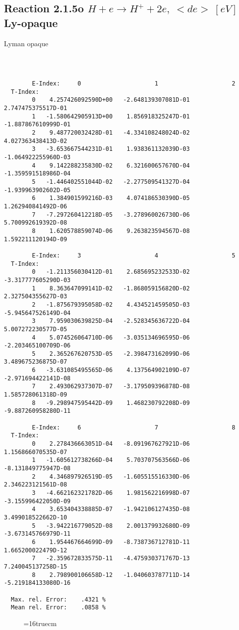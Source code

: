 \documentclass[12pt]{article}
\begin{document}
\subsection{
Reaction 2.1.5o  $ H + e \rightarrow H^+ + 2e, \   <de> \ [eV]$ Ly-opaque}

Lyman opaque

\begin{small}\begin{verbatim}



        E-Index:     0                     1                     2
  T-Index:
        0    4.257426092590D+00   -2.648139307081D-01    2.747475375517D-01
        1   -1.580642905913D+00    1.856918325247D-01   -1.887867610999D-01
        2    9.487720032428D-01   -4.334108248024D-02    4.027363438413D-02
        3   -3.653667544231D-01    1.938361132039D-03   -1.064922255960D-03
        4    9.142288235830D-02    6.321600657670D-04   -1.359591518986D-04
        5   -1.446402551044D-02   -2.277509541327D-04   -1.939963902602D-05
        6    1.384901599216D-03    4.074186530390D-05    1.262940841492D-06
        7   -7.297260412218D-05   -3.278960026730D-06    5.700992619392D-08
        8    1.620578859074D-06    9.263823594567D-08    1.592211120194D-09

        E-Index:     3                     4                     5
  T-Index:
        0   -1.211356030412D-01    2.685695232533D-02   -3.317777605290D-03
        1    8.363647099141D-02   -1.868059156820D-02    2.327504355627D-03
        2   -1.875679395058D-02    4.434521459505D-03   -5.945647526149D-04
        3    7.959030639825D-04   -2.528345636722D-04    5.007272230577D-05
        4    5.074526064710D-06   -3.035134696595D-06   -2.203465100709D-06
        5    2.365267620753D-05   -2.398473162099D-06    3.489675236875D-07
        6   -3.631085495565D-06    4.137564902109D-07   -2.971694422141D-08
        7    2.493062937307D-07   -3.179509396878D-08    1.585728061318D-09
        8   -9.298947595442D-09    1.468230792208D-09   -9.887260958280D-11

        E-Index:     6                     7                     8
  T-Index:
        0    2.278436663051D-04   -8.091967627921D-06    1.156866070535D-07
        1   -1.605612738266D-04    5.703707563566D-06   -8.131849775947D-08
        2    4.346897926519D-05   -1.605515516330D-06    2.346223121561D-08
        3   -4.662162321782D-06    1.981562216998D-07   -3.155996422050D-09
        4    3.653404338885D-07   -1.942106127435D-08    3.499018522662D-10
        5   -3.942216779052D-08    2.001379932680D-09   -3.673145766979D-11
        6    1.954467664699D-09   -8.738736712781D-11    1.665200022479D-12
        7   -2.359672833575D-11   -4.475930371767D-13    7.240045137258D-15
        8    2.798900106658D-12   -1.040603787711D-14   -5.219184133080D-16

  Max. rel. Error:    .4321 %
  Mean rel. Error:    .0858 %

\end{verbatim}\end{small}
\begin{figure} \label{2.1.5li2o}
\epsfxsize=16truecm
\end{figure}
\newpage
\end{document}
